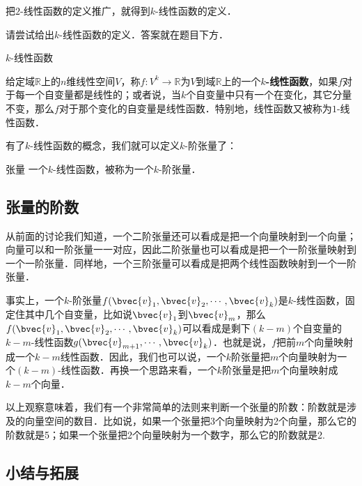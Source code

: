 把$2$-线性函数的定义推广，就得到$k$-线性函数的定义．

\begin{exercise}{}
请尝试给出$k$-线性函数的定义．答案就在题目下方．
\end{exercise}

\begin{definition}{$k$-线性函数}

给定域$\mathbb{R}$上的$n$维线性空间$V$，称$f:V^k\rightarrow \mathbb{R}$为$V$到域$\mathbb{R}$上的一个\textbf{$k$-线性函数}，如果$f$对于每一个自变量都是线性的；或者说，当$k$个自变量中只有一个在变化，其它分量不变，那么$f$对于那个变化的自变量是线性函数．特别地，线性函数又被称为$1$-线性函数．

\end{definition}

有了$k$-线性函数的概念，我们就可以定义$k$-阶张量了：

\begin{definition}{张量}
一个$k$-线性函数，被称为一个$k$-阶张量．
\end{definition}

\subsection{张量的阶数}

从前面的讨论我们知道，一个二阶张量还可以看成是把一个向量映射到一个向量；向量可以和一阶张量一一对应，因此二阶张量也可以看成是把一个一阶张量映射到一个一阶张量．同样地，一个三阶张量可以看成是把两个线性函数映射到一个一阶张量．

事实上，一个$k$-阶张量$f(\bvec{v}_1, \bvec{v}_2, \cdots,\bvec{v}_k)$是$k$-线性函数，固定住其中几个自变量，比如说$\bvec{v}_1$到$\bvec{v}_m$，那么$f(\bvec{v}_1, \bvec{v}_2,\cdots,\bvec{v}_k)$可以看成是剩下$(k-m)$个自变量的$k-m$-线性函数$g(\bvec{v}_{m+1}, \cdots,\bvec{v}_k)$．也就是说，$f$把前$m$个向量映射成一个$k-m$线性函数．因此，我们也可以说，一个$k$阶张量把$m$个向量映射为一个$(k-m)$-线性函数．再换一个思路来看，一个$k$阶张量是把$m$个向量映射成$k-m$个向量．

以上观察意味着，我们有一个非常简单的法则来判断一个张量的阶数：阶数就是涉及的向量空间的数目．比如说，如果一个张量把3个向量映射为2个向量，那么它的阶数就是5；如果一个张量把2个向量映射为一个数字，那么它的阶数就是2. 

\subsection{小结与拓展}

